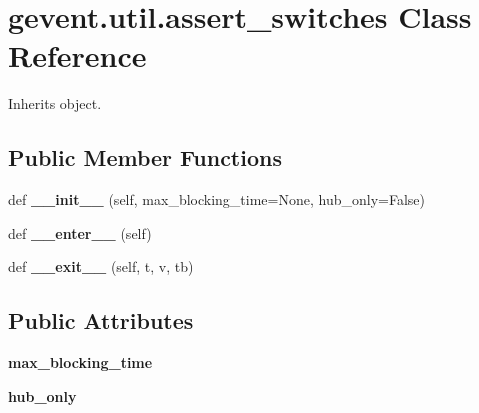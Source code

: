 \hypertarget{classgevent_1_1util_1_1assert__switches}{}\section{gevent.\+util.\+assert\+\_\+switches Class Reference}
\label{classgevent_1_1util_1_1assert__switches}


Inherits object.

\subsection*{Public Member Functions}
\begin{DoxyCompactItemize}
\item 
\mbox{\label{classgevent_1_1util_1_1assert__switches_a464a2c7aa3eca80ca31f7753172193b5}} 
def {\bfseries \+\_\+\+\_\+init\+\_\+\+\_\+} (self, max\+\_\+blocking\+\_\+time=None, hub\+\_\+only=False)
\item 
\mbox{\label{classgevent_1_1util_1_1assert__switches_af685d56b1374d9402c3d9e03e68a7871}} 
def {\bfseries \+\_\+\+\_\+enter\+\_\+\+\_\+} (self)
\item 
\mbox{\label{classgevent_1_1util_1_1assert__switches_a7297ddef7d16722b1d635388ca3a851d}} 
def {\bfseries \+\_\+\+\_\+exit\+\_\+\+\_\+} (self, t, v, tb)
\end{DoxyCompactItemize}
\subsection*{Public Attributes}
\begin{DoxyCompactItemize}
\item 
\mbox{\label{classgevent_1_1util_1_1assert__switches_ae2d1d06d1b23a6521d52b0121fff199e}} 
{\bfseries max\+\_\+blocking\+\_\+time}
\item 
\mbox{\label{classgevent_1_1util_1_1assert__switches_ab126ac6d4aad16351dcdf9b804b3831d}} 
{\bfseries hub\+\_\+only}
\end{DoxyCompactItemize}
